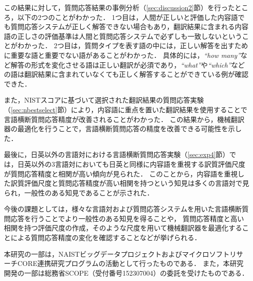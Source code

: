 \documentclass[japanese]{jnlp_1.4}
\begin{document}
この結果に対して，質問応答結果の事例分析（{\ref{sec:discussion2}}節）を行ったところ，以下の2つのことがわかった．
1つ目は，人間が正しいと評価した内容語でも質問応答システムが正しく解答できない場合もあり，翻訳結果に含まれる内容語の正しさの評価基準は人間と質問応答システムで必ずしも一致しないということがわかった．
2つ目は，質問タイプを表す語の中には，正しい解答を出すために重要な語と重要でない語があることがわかった．
具体的には，{\it ``how many''}など解答の形式を変化させる語は正しい翻訳が必須であり，{\it ``what''}や{\it ``which''}などの語は翻訳結果に含まれていなくても正しく解答することができている例が確認できた．

また，NISTスコアに基づいて選択された翻訳結果の質問応答実験（{\ref{sec:nbestselect}}節）により，内容語に重点を置いた翻訳結果を使用することで言語横断質問応答精度が改善されることがわかった．
この結果から，機械翻訳器の最適化を行うことで，言語横断質問応答の精度を改善できる可能性を示した．

最後に，日英以外の言語対における言語横断質問応答実験（{\ref{sec:exp4}}節）では，日英以外の3言語対においても日英と同様に内容語を重視する訳質評価尺度が質問応答精度と相関が高い傾向が見られた．
このことから，内容語を重視した訳質評価尺度と質問応答精度が高い相関を持つという知見は多くの言語対で見られ，一般性のある知見であることが示された．

今後の課題としては，様々な言語対および質問応答システムを用いた言語横断質問応答を行うことでより一般性のある知見を得ることや，
質問応答精度と高い相関を持つ評価尺度の作成，そのような尺度を用いて機械翻訳器を最適化することによる質問応答精度の変化を確認することなどが挙げられる．



\acknowledgment

\vspace{-0.5\Cvs}
本研究の一部は，NAISTビッグデータプロジェクトおよびマイクロソフトリサーチCORE連携研究プログラムの活動として行ったものである．
また，本研究開発の一部は総務省SCOPE（受付番号152307004）の委託を受けたものである．
\end{document}
